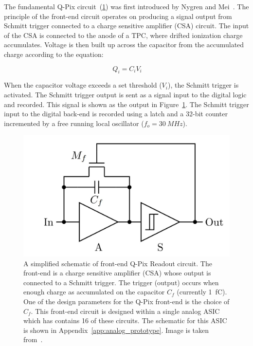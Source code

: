The fundamental Q-Pix circuit~(\ref{fig:qpixCircuit}) was first introduced by Nygren and Mei~\citep{qpix:nygren:mei}.
The principle of the front-end circuit operates on producing a signal output from Schmitt trigger connected to a charge sensitive amplifier (CSA) circuit.
The input of the CSA is connected to the anode of a TPC, where drifted ionization charge accumulates.
Voltage is then built up across the capacitor from the accumulated charge according to the equation:

\begin{equation}~\label{eq:capacitor}
Q_{i} = C_{i}V_{i}
\end{equation}

When the capacitor voltage exceeds a set threshold ($V_{i}$), the Schmitt trigger is activated.
The Schmitt trigger output is sent as a signal input to the digital logic and recorded.
This signal is shown as the output in Figure~\ref{fig:qpixCircuit}.
The Schmitt trigger input to the digital back-end is recorded using a latch and a 32-bit counter incremented by a free running local oscillator ($f_{o} = 30~\unit{MHz}$).

\begin{figure}[]
\centering
\includegraphics[width=\textwidth]{images/qpix_circuit.jpg}
\caption{A simplified schematic of front-end Q-Pix Readout circuit.
The front-end is a charge sensitive amplifier (CSA) whose output is connected to a Schmitt trigger.
The trigger (output) occurs when enough charge as accumulated on the capacitor $C_{f}$ (currently 1~\unit{fC}).
One of the design parameters for the Q-Pix front-end is the choice of $C_{f}$.
This front-end circuit is designed within a single analog ASIC which has contains 16 of these circuits.
The schematic for this ASIC is shown in Appendix~\ref{app:analog_prototype}.
Image is taken from~\citep{qpix:nygren:mei}.}
\label{fig:qpixCircuit}
\end{figure}

